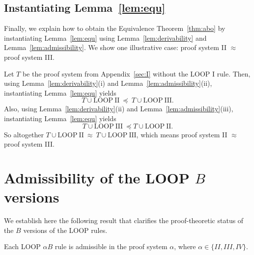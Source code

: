 \documentclass[manuscript, screen, review]{acmart}
\begin{document}
\subsection{Instantiating Lemma~\ref{lem:equ}}
\label{subsec:instantiate}

Finally, we explain how to obtain the Equivalence Theorem~\ref{thm:abo} by instantiating Lemma~\ref{lem:equ}
using Lemma~\ref{lem:derivability} and Lemma~\ref{lem:admissibility}.
We show one illustrative case: proof system II $\approx$ proof system III.

Let $T$ be the proof system from Appendix~\ref{sec:I} without the LOOP I rule.
Then, using Lemma~\ref{lem:derivability}(i) and Lemma~\ref{lem:admissibility}(ii), 
instantiating Lemma~\ref{lem:equ} yields
\[
 T \cup \mathrm{LOOP\ II}\ \preceq\ T \cup \mathrm{LOOP\ III}.
\]
Also, using Lemma~\ref{lem:derivability}(ii) and Lemma~\ref{lem:admissibility}(iii), 
instantiating Lemma~\ref{lem:equ} yields
\[
 T \cup \mathrm{LOOP\ III}\ \preceq T \cup \mathrm{LOOP\ II}.
\]
So altogether $T \cup \mathrm{LOOP\ II}\ \approx\ T \cup \mathrm{LOOP\ III}$,
which means proof system II $\approx$ proof system III.


\section{Admissibility of the LOOP $B$ versions}
\label{sec:B}

We establish here the following result that clarifies the
proof-theoretic status of the $B$ versions of the LOOP rules.

\begin{theorem}
  Each LOOP $\alpha B$ rule is admissible in the proof system
  $\alpha$, where $\alpha \in \{II, III, IV\}$.
\end{theorem}
\end{document}
